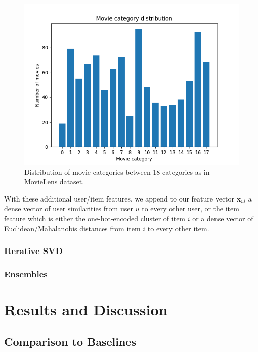 \documentclass[10pt,conference,compsocconf]{IEEEtran}
\begin{document}
    \begin{figure}
        \label{movie_category_distribution}
        \includegraphics[width=\columnwidth]{figures/movie_category_distribution.png}
        \caption{Distribution of movie categories between 18 categories as in MovieLens dataset.}
    \end{figure}

    With these additional user/item features, we append to our feature vector $\mathbf{x}_{ui}$ a dense vector of user similarities from user $u$ to every other user, or the item feature which is either the one-hot-encoded cluster of item $i$ or a dense vector of Euclidean/Mahalanobis distances from item $i$ to every other item.


    \subsubsection{Iterative SVD}

    \subsubsection{Ensembles}


    \section{Results and Discussion}


    \subsection{Comparison to Baselines}
\end{document}
